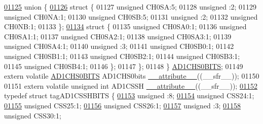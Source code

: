 \begin{DoxyCode}
\hypertarget{a00015_source_l01125}{}\hyperlink{a00015}{01125}   \textcolor{keyword}{union }\{
\hypertarget{a00015_source_l01126}{}\hyperlink{a00015}{01126}     \textcolor{keyword}{struct }\{
01127       \textcolor{keywordtype}{unsigned} CH0SA:5;
01128       \textcolor{keywordtype}{unsigned} :2;
01129       \textcolor{keywordtype}{unsigned} CH0NA:1;
01130       \textcolor{keywordtype}{unsigned} CH0SB:5;
01131       \textcolor{keywordtype}{unsigned} :2;
01132       \textcolor{keywordtype}{unsigned} CH0NB:1;
01133     \};
\hypertarget{a00015_source_l01134}{}\hyperlink{a00015}{01134}     \textcolor{keyword}{struct }\{
01135       \textcolor{keywordtype}{unsigned} CH0SA0:1;
01136       \textcolor{keywordtype}{unsigned} CH0SA1:1;
01137       \textcolor{keywordtype}{unsigned} CH0SA2:1;
01138       \textcolor{keywordtype}{unsigned} CH0SA3:1;
01139       \textcolor{keywordtype}{unsigned} CH0SA4:1;
01140       \textcolor{keywordtype}{unsigned} :3;
01141       \textcolor{keywordtype}{unsigned} CH0SB0:1;
01142       \textcolor{keywordtype}{unsigned} CH0SB1:1;
01143       \textcolor{keywordtype}{unsigned} CH0SB2:1;
01144       \textcolor{keywordtype}{unsigned} CH0SB3:1;
01145       \textcolor{keywordtype}{unsigned} CH0SB4:1;
01146     \};
01147   \};
01148 \} \hyperlink{a00014_d1/d09/a00077}{AD1CHS0BITS};
01149 \textcolor{keyword}{extern} \textcolor{keyword}{volatile} \hyperlink{a00014_d1/d09/a00077}{AD1CHS0BITS} AD1CHS0bits \hyperlink{a00015_a493c46f03454991ccc5aa7a6e1dfb2a7}{\_\_attribute\_\_}((\_\_sfr\_\_));
01150 
01151 \textcolor{keyword}{extern} \textcolor{keyword}{volatile} \textcolor{keywordtype}{unsigned} \textcolor{keywordtype}{int}  AD1CSSH \hyperlink{a00015_a493c46f03454991ccc5aa7a6e1dfb2a7}{\_\_attribute\_\_}((\_\_sfr\_\_));
\hypertarget{a00015_source_l01152}{}\hyperlink{a00014}{01152} \textcolor{keyword}{typedef} \textcolor{keyword}{struct }tagAD1CSSHBITS \{
\hypertarget{a00015_source_l01153}{}\hyperlink{a00014_adf71f3d8410c1f1dbbc96680a92c49af}{01153}   \textcolor{keywordtype}{unsigned} :8;
\hypertarget{a00015_source_l01154}{}\hyperlink{a00014_a179594fd85a0024675d34825b096e673}{01154}   \textcolor{keywordtype}{unsigned} CSS24:1;
\hypertarget{a00015_source_l01155}{}\hyperlink{a00014_a23d4f62cc0a980ee2d9fa1110338c65a}{01155}   \textcolor{keywordtype}{unsigned} CSS25:1;
\hypertarget{a00015_source_l01156}{}\hyperlink{a00014_a3aa55caf4abfc1b2814cbbaf8459c987}{01156}   \textcolor{keywordtype}{unsigned} CSS26:1;
\hypertarget{a00015_source_l01157}{}\hyperlink{a00014_acaf2d0924a107ec6e8d2e31febaf66f9}{01157}   \textcolor{keywordtype}{unsigned} :3;
\hypertarget{a00015_source_l01158}{}\hyperlink{a00014_a361b68bd74d71746af4c98eae8e3d16a}{01158}   \textcolor{keywordtype}{unsigned} CSS30:1;

\end{DoxyCode}
